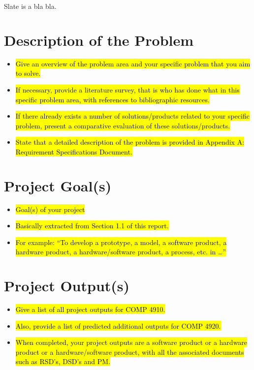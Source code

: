 {Slate is a bla bla.}



\section{Description of the Problem}

\begin{itemize}
	\item \hl{Give an overview of the problem area and your specific problem that you aim to solve.}
	\item \hl{If necessary, provide a literature survey, that is who has done what in this specific problem area, with references to bibliographic resources.}
	\item \hl{If there already exists a number of solutions/products related to your specific problem, present a comparative evaluation of these solutions/products.}
	\item \hl{State that a detailed description of the problem is provided in Appendix A: Requirement Specifications Document.}
\end{itemize}


\section{Project Goal(s)}

\begin{itemize}
	\item \hl{Goal(s) of your project}
	\item \hl{Basically extracted from Section 1.1 of this report.}
	\item \hl{For example: ``To develop a prototype, a model, a software product, a hardware product, a hardware/software product, a process, etc. in \ldots''}
\end{itemize}

\section{Project Output(s)}

\begin{itemize}
	\item \hl{Give a list of all project outputs for COMP 4910.}
	\item \hl{Also, provide a list of predicted additional outputs for COMP 4920.}
	\item \hl{When completed, your project outputs are a software product or a hardware product or a hardware/software product, with all the associated documents such as RSD's, DSD's and PM.}
\end{itemize}



